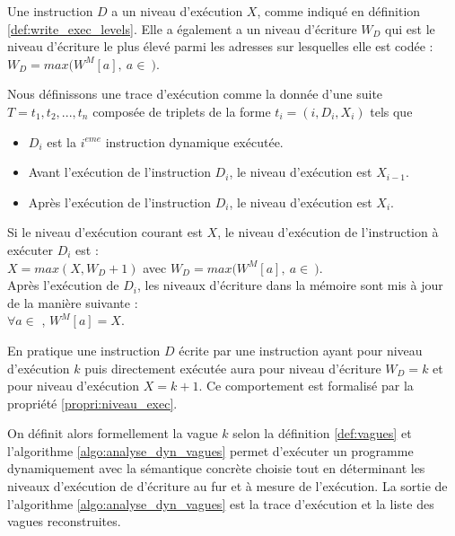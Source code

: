 Une instruction $D$ a un niveau d'exécution $X$, comme indiqué en définition \ref{def:write_exec_levels}.
Elle a également a un niveau d'écriture $W_D$ qui est le niveau d'écriture le plus élevé parmi les adresses sur lesquelles elle est codée : $W_D=max(W^M[a],\ a\in\ $$)$.


\begin{defi}
Nous définissons une trace d'exécution comme la donnée d'une suite $T=t_1, t_2, ..., t_n$ composée de triplets de la forme $t_i=(i, D_i, X_i)$ tels que
\begin{itemize}
 \item $D_i$ est la $i^{eme}$ instruction dynamique exécutée.
 \item Avant l'exécution de l'instruction $D_i$, le niveau d'exécution est \texttt{$X_{i-1}$}.
 \item Après l'exécution de l'instruction $D_i$, le niveau d'exécution est \texttt{$X_i$}.
\end{itemize}
\label{def:write_exec_levels}
\end{defi}

\begin{propri}
 Si le niveau d'exécution courant est $X$, le niveau d'exécution de l'instruction à exécuter $D_i$ est :\\
 $X=max(X, W_D+1)$ avec $W_D=max(W^M[a],\ a\in\ $$)$.\\
 Après l'exécution de $D_i$, les niveaux d'écriture dans la mémoire sont mis à jour de la manière suivante :\\
 $\forall a\in$ , $W^M[a]=X$.
\label{propri:niveau_exec}
\end{propri}

En pratique une instruction $D$ écrite par une instruction ayant pour niveau d'exécution $k$ puis directement exécutée aura pour niveau d'écriture $W_D=k$ et pour niveau d'exécution $X=k+1$. Ce comportement est formalisé par la propriété \ref{propri:niveau_exec}.

On définit alors formellement la vague $k$ selon la définition \ref{def:vagues} et l'algorithme \ref{algo:analyse_dyn_vagues} permet d'exécuter un programme dynamiquement avec la sémantique concrète choisie tout en déterminant les niveaux d'exécution de d'écriture au fur et à mesure de l'exécution. La sortie de l'algorithme \ref{algo:analyse_dyn_vagues} est la trace d'exécution et la liste des vagues reconstruites.
\\

